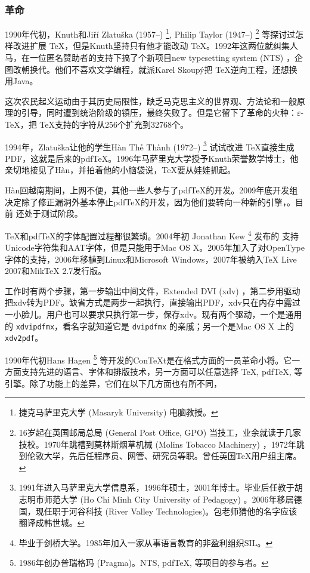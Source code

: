 \subsubsection{革命}

1990年代初，Knuth和Jiří Zlatuška (1957--)\indexZlatuska{} \footnote{捷克马萨里克大学 (Masaryk University) 电脑教授。}, Philip Taylor (1947--)\indexTaylor{} \footnote{16岁起在英国邮局总局 (General Post Office, GPO) 当技工，业余就读于几家技校。1970年跳槽到莫林斯烟草机械 (Molins Tobacco Machinery) ，1972年跳到伦敦大学，先后任程序员、网管、研究员等职。曾任英国TeX用户组主席。} 等探讨过怎样改进扩展 \TeX ，但是Knuth坚持只有他才能改动 \TeX。1992年这两位就纠集人马，在一位匿名赞助者的支持下搞了个新项目new typesetting system (NTS) ，企图改朝换代。他们不喜欢文学编程，就派Karel Skoupý把 \TeX 逆向工程，还想换用Java。

这次农民起义运动由于其历史局限性，缺乏马克思主义的世界观、方法论和一般原理的引导，同时遭到统治阶级的镇压，最终失败了。但是它留下了革命的火种：$\varepsilon$-\TeX ，把 \TeX 支持的字符从256个扩充到32768个。

1994年，Zlatuška让他的学生{\lmr Hàn Thế Thành} (1972--)\indexHan{} \footnote{1991年进入马萨里克大学信息系，1996年硕士，2001年博士。毕业后任教于胡志明市师范大学 (Ho Chi Minh City University of Pedagogy) 。2006年移居德国，现任职于河谷科技 (River Valley Technologies)。包老师猜他的名字应该翻译成韩世城。} 试试改进 \TeX 直接生成PDF，这就是后来的pdfTeX。1996年马萨里克大学授予Knuth荣誉数学博士，他亲切地接见了Hàn，并拍着他的小脑袋说，\TeX 要从娃娃抓起。

Hàn回越南期间，上网不便，其他一些人参与了pdfTeX的开发。2009年底开发组决定除了修正漏洞外基本停止pdfTeX的开发，因为他们要转向一种新的引擎，\LuaTeX。目前 \LuaTeX 还处于测试阶段。

\TeX 和pdfTeX的字体配置过程都很繁琐。2004年初 Jonathan Kew\indexKew{} \footnote{毕业于剑桥大学。1985年加入一家从事语言教育的非盈利组织SIL\indexSIL。} 发布的 \XeTeX 支持Unicode字符集和AAT字体，但是只能用于Mac OS X。2005年加入了对OpenType 字体的支持，2006年移植到Linux和Microsoft Windows，2007年被纳入TeX Live 2007和MikTeX 2.7发行版。

\XeTeX 工作时有两个步骤，第一步输出中间文件，Extended DVI (xdv) ，第二步用驱动把xdv转为PDF。缺省方式是两步一起执行，直接输出PDF，xdv只在内存中露过一小脸儿。用户也可以要求只执行第一步，保存xdv。\XeTeX 现有两个驱动，一个是通用的 \texttt{xdvipdfmx}，看名字就知道它是 \texttt{dvipdfmx} 的亲戚；另一个是Mac OS X 上的 \texttt{xdv2pdf}。

1990年代初Hans Hagen\indexHagen{} \footnote{1986年创办普瑞格玛 (Pragma)\indexPragma。NTS, pdfTeX, \LuaTeX 等项目的参与者。} 等开发的Con\TeX t是在格式方面的一员革命小将。它一方面支持先进的语言、字体和排版技术，另一方面可以任意选择 \TeX, pdfTeX, \LuaTeX 等引擎。除了功能上的差异，它们在以下几方面也有所不同，


